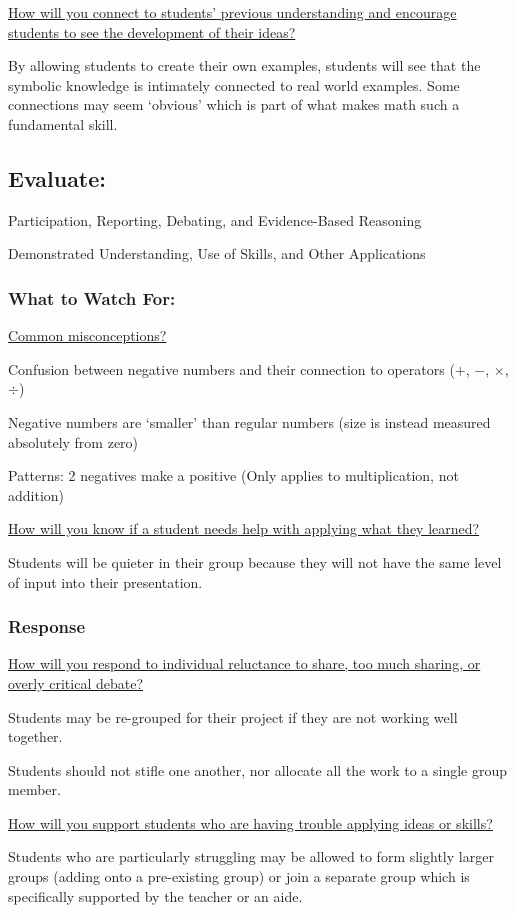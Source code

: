 \documentclass{notes}
\begin{document}
\ul{How will you connect to students’ previous understanding and encourage students to see the development of their ideas?}

By allowing students to create their own examples, students will see that the symbolic knowledge is intimately connected to real world examples. Some connections may seem `obvious' which is part of what makes math such a fundamental skill.

\subsection{Evaluate:}

Participation, Reporting, Debating, and Evidence-Based Reasoning

Demonstrated Understanding, Use of Skills, and Other Applications

\subsubsection{What to Watch For:}

\ul{Common misconceptions?}

Confusion between negative numbers and their connection to operators (\(+\), \(-\), \(\times\), \(\div\))

Negative numbers are `smaller' than regular numbers (size is instead measured absolutely from zero)

Patterns: 2 negatives make a positive (Only applies to multiplication, not addition)

\ul{How will you know if a student needs help with applying what they learned?}

Students will be quieter in their group because they will not have the same level of input into their presentation.

\subsubsection{Response}

\ul{How will you respond to individual reluctance to share, too much sharing, or overly critical debate?}

Students may be re-grouped for their project if they are not working well together.

Students should not stifle one another, nor allocate all the work to a single group member.

\ul{How will you support students who are having trouble applying ideas or skills?}

Students who are particularly struggling may be allowed to form slightly larger groups (adding onto a pre-existing group) or join a separate group which is specifically supported by the teacher or an aide.
\end{document}
